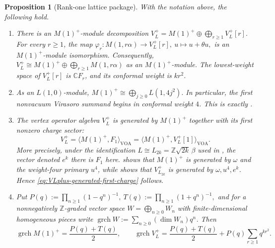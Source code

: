 \documentclass[12pt,leqno]{amsart}
\numberwithin{equation}{section} \newtheorem{thm}{Theorem}[section] \newtheorem{lem}[thm]{Lemma} \newtheorem{ex}[thm]{Example} \newtheorem{prop}[thm]{Proposition} \newtheorem{cor}[thm]{Corollary} \newtheorem{defi}[thm]{Definition} \newtheorem{rmk}[thm]{Remark} \newtheorem{notation}[thm]{Notation}
\newcommand{\grch}{\operatorname{grch}}
\def\Z{\mathbb{Z}} \def\N{\mathbb{N}} \def\A{\mathbb{A}} \def\C{\mathbb{C}} \def\R{\mathbb{R}} \def\Q{\mathbb{Q}} \def\F{\mathbb{F}}
\begin{document}
\begin{prop}[Rank-one lattice package]\label{prop:rank-one-lattice-package}
With the notation above, the following hold.
\begin{enumerate}[label=\textnormal{(\roman*)}]
\item There is an $M(1)^+$-module decomposition
\(V_L^+=M(1)^+\oplus\bigoplus_{r\ge1}V_L^+[r].\) For every $r\ge1$, the map \(\varphi_r:M(1,r\alpha)\longrightarrow V_L^+[r],\ u\longmapsto u+\theta u,\) is an $M(1)^+$-module isomorphism. Consequently, \(V_L^+\cong M(1)^+\oplus\bigoplus_{r\ge1}M(1,r\alpha)\) as an $M(1)^+$-module. The lowest-weight space of $V_L^+[r]$ is $\C F_r$, and its conformal weight is $kr^2$.

\item As an $L(1,0)$-module,
\(M(1)^+\cong\bigoplus_{j\ge0}L(1,4j^2).\) In particular, the first nonvacuum Virasoro summand begins in conformal weight $4$. This is exactly \cite[Theorem~2.7(1)]{DG98}.

\item The vertex operator algebra $V_L^+$ is generated by $M(1)^+$ together
with its first nonzero charge sector:
\begin{equation}\label{eq:VLplus-generated-first-charge}
V_L^+=\langle M(1)^+,F_1\rangle_{\mathrm{VOA}}
     =\langle M(1)^+,V_L^+[1]\rangle_{\mathrm{VOA}}.
\end{equation}
More precisely, under the identification $L\cong L_{2k}=\Z\sqrt{2k}\,\beta$ used in \cite[Section~2]{DG98}, the vector denoted $e^k$ there is $F_1$ here. \cite[Theorem~2.7(2)]{DG98} shows that $M(1)^+$ is generated by $\omega$ and the weight-four primary $u^4$, while \cite[Theorem~2.9]{DG98} shows that $V_{L_{2k}}^+$ is generated by $\omega,u^4,e^k$. Hence \eqref{eq:VLplus-generated-first-charge} follows.

\item Put
\(P(q):=\prod_{n\ge1}(1-q^n)^{-1},\ T(q):=\prod_{n\ge1}(1+q^n)^{-1},\) and for a nonnegatively $\Z$-graded vector space $W=\bigoplus_{n\ge0}W_n$ with finite-dimensional homogeneous pieces write $\grch W:=\sum_{n\ge0}(\dim W_n)q^n$. Then
\begin{equation}\label{eq:rank-one-character-interface}
\grch M(1)^+=\frac{P(q)+T(q)}2,
\qquad
\grch V_L^+
=\frac{P(q)+T(q)}2+P(q)\sum_{r\ge1}q^{kr^2}.
\end{equation}


\end{enumerate}
\end{prop}
\end{document}
